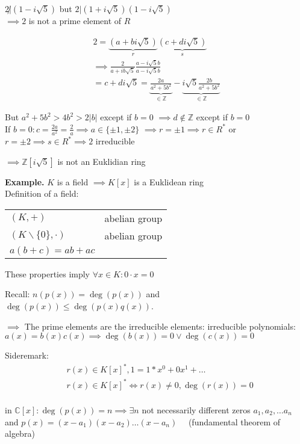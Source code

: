 $2 \not| (1 - i\sqrt{5})$ but $2 | (1+i\sqrt{5})(1-i\sqrt{5})$ \\
$\implies 2$ is not a prime element of $R$

\begin{align*}
  2 = \underbrace{(a+bi \sqrt{5})}_{r} \underbrace{(c+di\sqrt{5})}_{s}\\
  \implies \frac{2}{a+ib\sqrt{5}} \frac{a-i\sqrt{5}b}{a-i\sqrt{5}b} \\
  = c+di\sqrt{5} 
= \underbrace{\frac{2a}{a^2 + 5b^2}}_{\in \mathbb{Z}} - \underbrace{i\sqrt{5} \frac{2b}{a^2 + 5b^2}}_{\in \mathbb{Z}}
\end{align*}

But $a^2 + 5b^2 > 4b^2 > 2|b|$ except if $ b=0$ $\implies d \not\in \mathbb{Z}$ except if $b=0$ \\
If $b=0: c = \frac{2a}{a^2} = \frac{2}{a} \implies a \in \{\pm 1, \pm 2\}$
$\implies r = \pm 1 \implies r \in R^{*}$ or $ r = \pm 2 \implies s \in R^{*} \implies 2 $ irreducible

$\implies \mathbb{Z}[i\sqrt{5}]$ is not an Euklidian ring

\textbf{Example.}
$K$ is a field $\implies K[x]$ is a Euklidean ring\\

Definition of a field:
\begin{tabular}{ll}
  $(K,+)$ &abelian group \\
  $(K\backslash \{0\}, \cdot)$ & abelian group \\
  $a(b+c) = ab + ac$
\end{tabular}

These properties imply $\forall x \in K: 0\cdot x = 0$

Recall: 
$n(p(x)) = \deg(p(x))$ and 
$\deg(p(x)) \leq \deg(p(x) q(x))$. 

$\implies$ The prime elements are the irreducible elements: irreducible polynomials: $a(x) = b(x)c(x) \implies \deg(b(x))=0 \lor \deg(c(x))=0$

Sideremark:
\begin{align*}
  &r(x) \in K[x]^{*}, 1 = 1*x^0 + 0 x^1 + \ldots \\
  &r(x) \in K[x]^{*} \Leftrightarrow r(x) \neq 0, \deg(r(x)) = 0\\
\end{align*}

in $\mathbb{C}[x]: 
\deg(p(x)) = n \implies \exists n$ not necessarily different zeros $a_1, a_2, \ldots a_n$ and $p(x) = (x-a_1)(x-a_2) \ldots (x-a_n) \quad$ (fundamental theorem of algebra)

